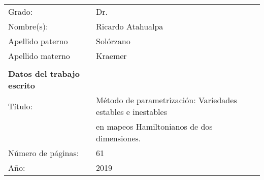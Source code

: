 \begin{tabular}{ll}
Grado:	&  Dr.\\ 
Nombre(s):	&  Ricardo Atahualpa\\ 
Apellido paterno	& Solórzano\\ 
Apellido materno	&  Kraemer\\ 
&  \\  	
\textbf{Datos del trabajo escrito}& \\
Título:& Método de parametrización: Variedades estables e inestables \\
& en mapeos Hamiltonianos de dos dimensiones.\\
Número de páginas:& 61\\
Año:&2019\\
\end{tabular} \\
















